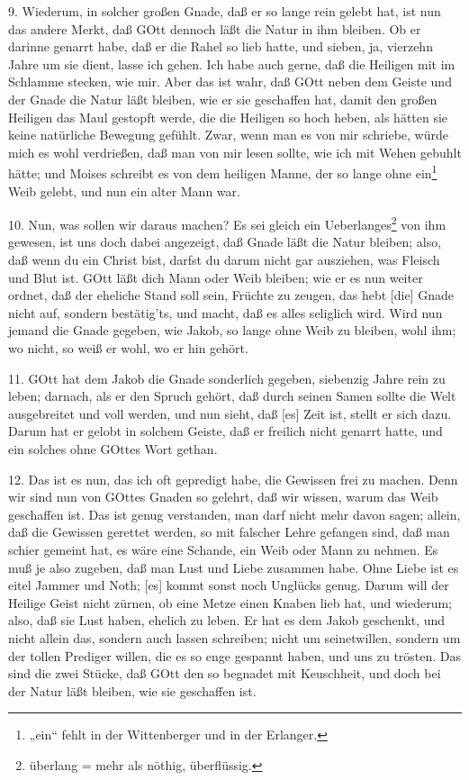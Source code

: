 9. Wiederum, in solcher großen Gnade, daß er so lange rein gelebt hat, ist nun das andere
Merkt, daß GOtt dennoch läßt die Natur in ihm bleiben. Ob er darinne genarrt habe, daß er die Rahel so lieb hatte, und sieben, ja, vierzehn Jahre um sie dient, lasse ich gehen. Ich habe auch gerne, daß die Heiligen mit im Schlamme stecken, wie mir. Aber das ist wahr, daß GOtt neben dem Geiste und der Gnade die Natur läßt bleiben, wie er sie geschaffen hat, damit den großen Heiligen das Maul gestopft werde, die die Heiligen so hoch heben, als hätten sie keine natürliche Bewegung gefühlt. Zwar, wenn man es von mir schriebe, würde mich es wohl verdrießen, daß man von mir lesen sollte, wie ich mit Wehen gebuhlt hätte; und Moises schreibt es von dem heiligen Manne, der so lange ohne ein\footnote{„ein“ fehlt in der Wittenberger und in der Erlanger.} Weib gelebt, und nun ein alter Mann war.

10. Nun, was sollen wir daraus machen? Es sei gleich ein Ueberlanges\footnote{überlang = mehr als nöthig, überflüssig.} von ihm gewesen, ist uns doch dabei angezeigt, daß Gnade läßt die Natur bleiben; also, daß wenn du ein Christ bist, darfst du darum nicht gar ausziehen, was Fleisch und Blut ist. GOtt läßt dich Mann oder Weib bleiben; wie er es nun weiter ordnet, daß der eheliche Stand soll sein, Früchte zu zeugen, das hebt [die] Gnade nicht auf, sondern bestätig'ts, und macht, daß es alles seliglich wird. Wird nun jemand die Gnade gegeben, wie Jakob, so lange ohne Weib zu bleiben, wohl ihm; wo nicht, so weiß er wohl, wo er hin gehört.

11. GOtt hat dem Jakob die Gnade sonderlich gegeben, siebenzig Jahre rein zu leben; darnach, als er den Spruch gehört, daß durch seinen Samen sollte die Welt ausgebreitet und voll werden, und nun sieht, daß [es] Zeit ist, stellt er sich dazu. Darum hat er gelobt in solchem Geiste, daß er freilich nicht genarrt hatte, und ein solches ohne GOttes Wort gethan.

12. Das ist es nun, das ich oft gepredigt habe, die Gewissen frei zu machen. Denn wir sind nun von GOttes Gnaden so gelehrt, daß wir wissen, warum das Weib geschaffen ist. Das ist genug verstanden, man darf nicht mehr davon sagen; allein, daß die Gewissen gerettet werden, so mit falscher Lehre gefangen sind, daß man schier gemeint hat, es wäre eine Schande, ein Weib oder Mann zu nehmen. Es muß je also zugeben, daß man Lust und Liebe zusammen habe. Ohne Liebe ist es eitel Jammer und Noth; [es] kommt sonst noch Unglücks genug. Darum will der Heilige Geist nicht zürnen, ob eine Metze einen Knaben lieb hat, und wiederum; also, daß sie Lust haben, ehelich zu leben. Er hat es dem Jakob geschenkt, und nicht allein das, sondern auch lassen schreiben; nicht um seinetwillen, sondern um der tollen Prediger willen, die es so enge gespannt haben, und uns zu trösten. Das sind die zwei Stücke, daß GOtt den so begnadet mit Keuschheit, und doch bei der Natur läßt bleiben, wie sie geschaffen ist.

